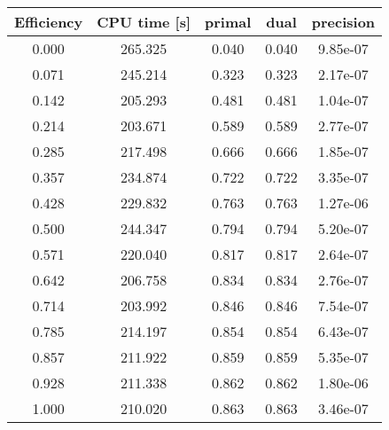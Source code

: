 \documentclass{article}
\begin{document}
\begin{minipage}{0.5\linewidth}
    \centering
    \begin{tabular}{c|c|c|c|c}
        Efficiency & CPU time [s]& primal& dual& precision\\
        \hline
        0.000 & 265.325 & 0.040 & 0.040 & 9.85e-07 \\
        0.071 & 245.214 & 0.323 & 0.323 & 2.17e-07 \\
        0.142 & 205.293 & 0.481 & 0.481 & 1.04e-07 \\
        0.214 & 203.671 & 0.589 & 0.589 & 2.77e-07 \\
        0.285 & 217.498 & 0.666 & 0.666 & 1.85e-07 \\
        0.357 & 234.874 & 0.722 & 0.722 & 3.35e-07 \\
        0.428 & 229.832 & 0.763 & 0.763 & 1.27e-06 \\
        0.500 & 244.347 & 0.794 & 0.794 & 5.20e-07 \\
        0.571 & 220.040 & 0.817 & 0.817 & 2.64e-07 \\
        0.642 & 206.758 & 0.834 & 0.834 & 2.76e-07 \\
        0.714 & 203.992 & 0.846 & 0.846 & 7.54e-07 \\
        0.785 & 214.197 & 0.854 & 0.854 & 6.43e-07 \\
        0.857 & 211.922 & 0.859 & 0.859 & 5.35e-07 \\
        0.928 & 211.338 & 0.862 & 0.862 & 1.80e-06 \\
        1.000 & 210.020 & 0.863 & 0.863 & 3.46e-07 \\
        \hline
    \end{tabular}
    \label{tbl:p-005}
\end{minipage}
\\
\end{document}
